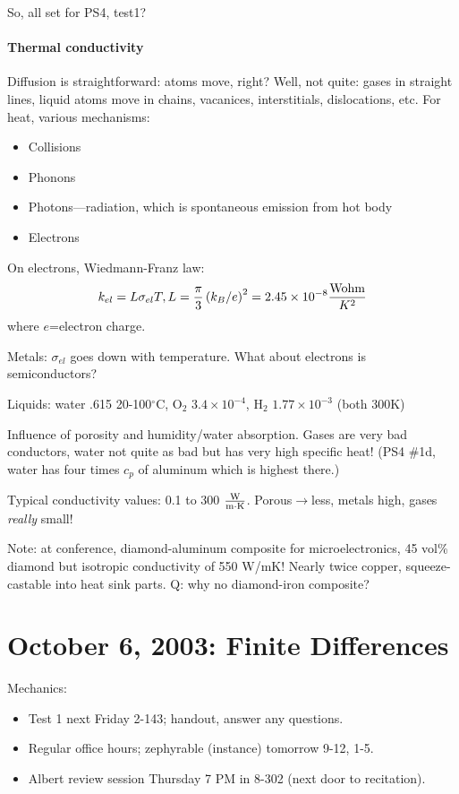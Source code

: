 \documentclass{report}
\begin{document}
So, all set for PS4, test1?

\paragraph{Thermal conductivity}

Diffusion is straightforward: atoms move, right?  Well, not quite: gases in
straight lines, liquid atoms move in chains, vacanices, interstitials,
dislocations, etc.  For heat, various mechanisms:
\begin{itemize}
\item Collisions
\item Phonons
\item Photons---radiation, which is spontaneous emission from hot body
\item Electrons
\end{itemize}
On electrons, Wiedmann-Franz law:
$$k_{el} = L \sigma_{el} T,
L=\frac{\pi}{3} \left(k_B/e\right)^2 =
2.45\times10^{-8}\frac{\rm W ohm}{K^2}$$
where $e$=electron charge.

Metals: $\sigma_{el}$ goes down with temperature.  What about electrons is
semiconductors?

Liquids: water .615 20-100$^\circ$C, O$_2$ $3.4\times10^{-4}$, H$_2$
$1.77\times10^{-3}$ (both 300K)

Influence of porosity and humidity/water absorption.  Gases are very bad
conductors, water not quite as bad but has very high specific heat!  (PS4 \#1d,
water has four times $c_p$ of aluminum which is highest there.)

Typical conductivity values: 0.1 to 300 $\rm\frac{W}{m\cdot K}$.
Porous$\rightarrow$less, metals high, gases {\em really} small!

Note: at conference, diamond-aluminum composite for microelectronics, 45 vol\%
diamond but isotropic conductivity of 550 W/mK!  Nearly twice copper,
squeeze-castable into heat sink parts.  Q: why no diamond-iron composite?
\newpage


\section{October 6, 2003: Finite Differences}

Mechanics:
\begin{itemize}
\item Test 1 next Friday 2-143; handout, answer any questions.
\item Regular office hours; zephyrable (instance) tomorrow 9-12, 1-5.
\item Albert review session Thursday 7 PM in 8-302 (next door to recitation).
\end{itemize}
\end{document}
